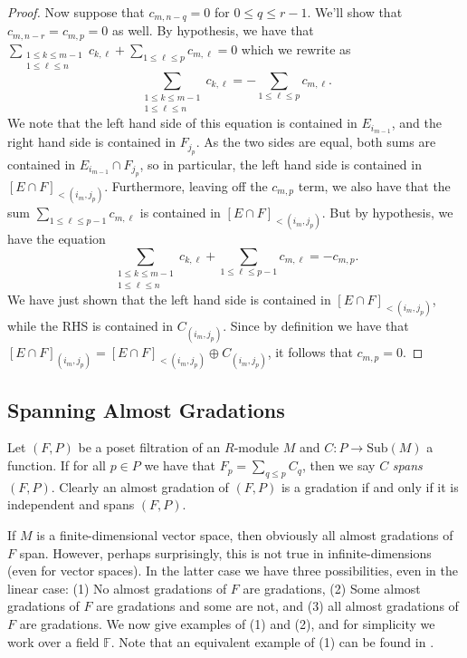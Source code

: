 \documentclass[oneside,11pt]{amsart}
\newcommand{\ff}{\ensuremath{\mathbb{F}}}
\newcommand{\Sub}{\ensuremath{\text{Sub}}}
\theoremstyle{definition}
\newtheorem{proof techniques}{Proof Techniques}
\begin{document}
\begin{proof}
Now suppose that $c_{m , n - q} = 0$ for $0 \leq q \leq r - 1$. We'll show that $c_{m , n - r} = c_{m , p} = 0$ as well. By hypothesis, we have that $\sum_{\substack{1 \leq k \leq m - 1 \\ 1 \leq \ell \leq n}} c_{k , \ell} + \sum_{1 \leq \ell \leq p} c_{m , \ell} = 0$ which we rewrite as 
\begin{equation*}
\sum_{\substack{1 \leq k \leq m - 1 \\ 1 \leq \ell \leq n}} c_{k , \ell} = - \sum_{1 \leq \ell \leq p} c_{m , \ell}. 
\end{equation*}
We note that the left hand side of this equation is contained in $E_{i_{m - 1}}$, and the right hand side is contained in $F_{j_p}$. As the two sides are equal, both sums are contained in $E_{i_{m - 1}} \cap F_{j_p}$, so in particular, the left hand side is contained in $[E \cap F]_{< (i_{m} , j_p)}$. Furthermore, leaving off the $c_{m , p}$ term, we also have that the sum $\sum_{1 \leq \ell \leq p - 1} c_{m , \ell}$ is contained in $[E \cap F]_{< (i_{m} , j_p)}$. But by hypothesis, we have the equation 
\begin{equation*}
\sum_{\substack{1 \leq k \leq m - 1 \\ 1 \leq \ell \leq n}} c_{k , \ell} + \sum_{1 \leq \ell \leq p - 1} c_{m , \ell} = - c_{m , p}.
\end{equation*}
We have just shown that the left hand side is contained in $[E \cap F]_{< (i_{m} , j_p)}$, while the RHS is contained in $C_{(i_m , j_p)}$. Since by definition we have that $[E \cap F]_{( i_m, j_p ) } =  [E \cap F]_{ < ( i_m, j_p ) } \oplus C_{(i_m , j_p )}$, it follows that $c_{m , p} = 0$. 
\end{proof}


\subsection{Spanning Almost Gradations}

Let $(F , P)$ be a poset filtration of an $R$-module $M$ and $C: P \to \Sub(M)$ a function. If for all $p \in P$ we have that $F_p = \sum_{q \leq p} C_q$, then we say $C$ \emph{spans} $(F , P)$. Clearly an almost gradation of $(F , P)$ is a gradation if and only if it is independent and spans $(F , P)$. 


If $M$ is a finite-dimensional vector space, then obviously all almost gradations of $F$ span. However, perhaps surprisingly, this is not true in infinite-dimensions (even for vector spaces). In the latter case we have three possibilities, even in the linear case: (1) No almost gradations of $F$ are gradations, (2) Some almost gradations of $F$ are gradations and some are not, and (3) all almost gradations of $F$ are gradations. We now give examples of (1) and (2), and for simplicity we work over a field $\ff$. Note that an equivalent example of (1) can be found in \cite{bautista-liu-paquette2011}. 
\end{document}
